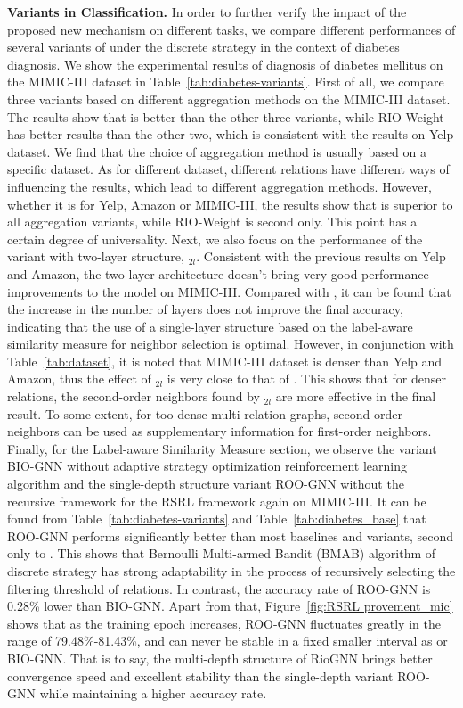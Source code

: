 \textbf{\RioGNN Variants in Classification.}
In order to further verify the impact of the proposed new mechanism on different tasks, we compare different performances of several variants of \RioGNN under the discrete strategy in the context of diabetes diagnosis. 
We show the experimental results of diagnosis of diabetes mellitus on the MIMIC-III dataset in Table~\ref{tab:diabetes-variants}.
First of all, we compare three variants based on different aggregation methods on the MIMIC-III dataset. 
The results show that \RioGNN is better than the other three variants, while RIO-Weight has better results than the other two, which is consistent with the results on Yelp dataset.
We find that the choice of aggregation method is usually based on a specific dataset. 
As for different dataset, different relations have different ways of influencing the results, which lead to different aggregation methods.
However, whether it is for Yelp, Amazon or MIMIC-III, the results show that \RioGNN is superior to all aggregation variants, while RIO-Weight is second only.
This point has a certain degree of universality.
Next, we also focus on the performance of the \RioGNN variant with two-layer structure, \RioGNN$_{2l}$.
Consistent with the previous results on Yelp and Amazon, the two-layer architecture doesn't bring very good performance improvements to the model on MIMIC-III. 
Compared with \RioGNN, it can be found that the increase in the number of layers does not improve the final accuracy, indicating that the use of a single-layer structure based on the label-aware similarity measure for neighbor selection is optimal. 
However, in conjunction with Table~\ref{tab:dataset}, it is noted that MIMIC-III dataset is denser than Yelp and Amazon, thus the effect of \RioGNN$_{2l}$ is very close to that of \RioGNN. 
This shows that for denser relations, the second-order neighbors found by \RioGNN$_{2l}$ are more effective in the final result. 
To some extent, for too dense multi-relation graphs, second-order neighbors can be used as supplementary information for first-order neighbors.
Finally, for the Label-aware Similarity Measure section, we observe the variant BIO-GNN without adaptive strategy optimization reinforcement learning algorithm and the single-depth structure variant ROO-GNN without the recursive framework for the RSRL framework again on MIMIC-III. 
It can be found from Table~\ref{tab:diabetes-variants} and Table~\ref{tab:diabetes_base} that ROO-GNN performs significantly better than most baselines and variants, second only to \RioGNN. 
This shows that Bernoulli Multi-armed Bandit (BMAB) algorithm of discrete strategy has strong adaptability in the process of recursively selecting the filtering threshold of relations. 
In contrast, the accuracy rate of ROO-GNN is 0.28\% lower than BIO-GNN. 
Apart from that, Figure~\ref{fig:RSRL provement_mic} shows that as the training epoch increases, ROO-GNN fluctuates greatly in the range of 79.48\%-81.43\%, and can never be stable in a fixed smaller interval as \RioGNN or BIO-GNN. 
That is to say, the multi-depth structure of RioGNN brings better convergence speed and excellent stability than the single-depth variant ROO-GNN while maintaining a higher accuracy rate. 


